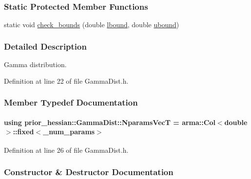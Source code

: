 \subsubsection*{Static Protected Member Functions}
\begin{DoxyCompactItemize}
\item 
static void \hyperlink{classprior__hessian_1_1UnivariateDist_aec85554be4019eb2c5d92203a4e6d9f8}{check\+\_\+bounds} (double \hyperlink{classprior__hessian_1_1GammaDist_ade738352c5a0e12da9d4fd2a09aafbf7}{lbound}, double \hyperlink{classprior__hessian_1_1GammaDist_a7292a1f23badc19d8c608d3a32fc6400}{ubound})
\end{DoxyCompactItemize}


\subsubsection{Detailed Description}
Gamma distribution. 



Definition at line 22 of file Gamma\+Dist.\+h.



\subsubsection{Member Typedef Documentation}
\paragraph[{\texorpdfstring{Nparams\+VecT}{NparamsVecT}}]{\setlength{\rightskip}{0pt plus 5cm}using {\bf prior\+\_\+hessian\+::\+Gamma\+Dist\+::\+Nparams\+VecT} =  arma\+::\+Col$<$double$>$\+::fixed$<$\+\_\+num\+\_\+params$>$}\hypertarget{classprior__hessian_1_1GammaDist_a01fd80ddf66dbb4eedb73e5ee272e838}{}\label{classprior__hessian_1_1GammaDist_a01fd80ddf66dbb4eedb73e5ee272e838}


Definition at line 26 of file Gamma\+Dist.\+h.



\subsubsection{Constructor \& Destructor Documentation}
